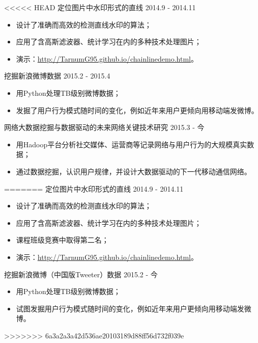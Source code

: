 \documentclass[9pt]{article}
\newenvironment{changemargin}[2]{%
  \begin{list}{}{%
    \setlength{\topsep}{0pt}%
    \setlength{\leftmargin}{#1}%
    \setlength{\rightmargin}{#2}%
    \setlength{\listparindent}{\parindent}%
    \setlength{\itemindent}{\parindent}%
    \setlength{\parsep}{\parskip}%
  }%
  \item[]}{\end{list}
}
\newenvironment{body} {
    \vspace*{-16pt}
    \begin{changemargin}{-0.25in}{-0.5in}
  } 
    {\end{changemargin}
}
\begin{document}
\begin{CJK*}{UTF8}{gbsn}
\begin{body}
<<<<<<< HEAD
    \vspace{14pt}
    定位图片中水印形式的直线 \hfill 2014.9 - 2014.11
    \begin{itemize}
    \itemsep 0pt
    \item 设计了准确而高效的检测直线水印的算法；
    \item 应用了含高斯滤波器、统计学习在内的多种技术处理图片；
    \item 演示：\href{http://TarnumG95.github.io/chainlinedemo.html}{http://TarnumG95.github.io/chainlinedemo.html}。
    \end{itemize}
    \smallskip
    挖掘新浪微博数据 \hfill 2015.2 - 2015.4
    \begin{itemize}
    \itemsep 0pt
    \item 用Python处理TB级别微博数据；
    \item 发掘了用户行为模式随时间的变化，例如近年来用户更倾向用移动端发微博。
    \end{itemize}
    \smallskip
网络大数据挖掘与数据驱动的未来网络关键技术研究 \hfill 2015.3 - 今
    \begin{itemize}
    \itemsep 0pt
    \item 用Hadoop平台分析社交媒体、运营商等记录网络与用户行为的大规模真实数据；
    \item 通过数据挖掘，认识用户规律，并设计大数据驱动的下一代移动通信网络。
    \end{itemize}
    \smallskip
=======
	\vspace{14pt}
	定位图片中水印形式的直线 \hfill 2014.9 - 2014.11
	\begin{itemize}
	\itemsep 0pt
	\item 设计了准确而高效的检测直线水印的算法；
	\item 应用了含高斯滤波器、统计学习在内的多种技术处理图片；
	\item 课程班级竞赛中取得第二名；
	\item 演示：\href{http://TarnumG95.github.io/chainlinedemo.html}{http://TarnumG95.github.io/chainlinedemo.html}。
	\end{itemize}
	\smallskip
	挖掘新浪微博（中国版Tweeter）数据 \hfill 2015.2 - 今
	\begin{itemize}
	\itemsep 0pt
	\item 用Python处理TB级别微博数据；
	\item  试图发掘用户行为模式随时间的变化，例如近年来用户更倾向用移动端发微博。
	\end{itemize}
	\smallskip
>>>>>>> 6a3a2a3a42d536ae20103189d88ff56d732f039e


\end{body}
\end{CJK*}
\end{document}
